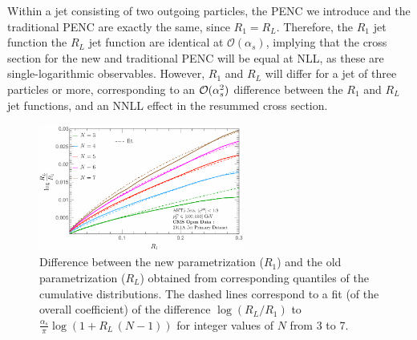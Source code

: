 Within a jet consisting of two outgoing particles, the PENC we introduce and the traditional PENC are exactly the same, since \(R_1 = R_L\).
%
Therefore, the \(R_1\) jet function the \(R_L\) jet function are identical at \(\mathcal{O}(\alpha_s)\),
implying that the cross section for the new and traditional PENC will be equal at NLL, as these are single-logarithmic observables.
%
However, \(R_1\) and \(R_L\) will differ for a jet of three particles or more, corresponding to an ${\cal O}(\alpha_s^2)$ difference between the \(R_1\) and \(R_L\) jet functions, and an NNLL effect in the resummed cross section.


\begin{figure}[h]
    \centering
    	\includegraphics[width=0.6\textwidth]{figures/eec-angles/ENC_quantiles.pdf}
        \caption[Difference between the new and traditional parameterizations of projected energy correlators obtained from the quantiles of the corresponding cumulative distributions.]{
        Difference between the new parametrization ($R_1$) and the old parametrization ($R_L$) obtained from corresponding quantiles of the cumulative distributions.
        The dashed lines correspond to a fit (of the overall coefficient) of the difference \( \log(R_L/R_1) \) to $\frac{\alpha_s}{\pi} \log(1+R_L\,(N-1))$ for integer values of $N$ from 3 to 7.
    }
	\label{fig:nll_equiv}%
\end{figure}


